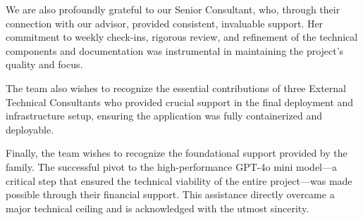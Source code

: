        We are also profoundly grateful to our Senior Consultant, who, through their
connection with our advisor, provided consistent, invaluable support. Her commitment to
weekly check-ins, rigorous review, and refinement of the technical components and
documentation was instrumental in maintaining the project's quality and focus.

        The team also wishes to recognize the essential contributions of three External
Technical Consultants who provided crucial support in the final deployment and
infrastructure setup, ensuring the application was fully containerized and deployable.

        Finally, the team wishes to recognize the foundational support provided by the family.
The successful pivot to the high-performance GPT-4o mini model—a critical step that
ensured the technical viability of the entire project—was made possible through their
financial support. This assistance directly overcame a major technical ceiling and is
acknowledged with the utmost sincerity.

\tableofcontents
\listoftables
\listoffigures
\cleardoublepage
